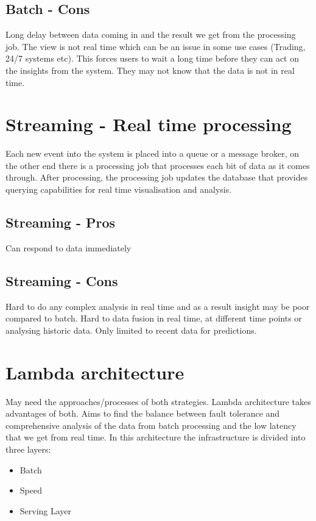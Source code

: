 \subsection{Batch - Cons}
Long delay between data coming in and the result we get from the processing job.
The view is not real time which can be an issue in some use cases (Trading, 24/7 systems etc).
This forces users to wait a long time before they can act on the insights from the system.
They may not know that the data is not in real time.

\section{Streaming - Real time processing}
Each new event into the system is placed into a queue or a message broker, on the other end there is a processing job that processes each bit of data as it comes through.
After processing, the processing job updates the database that provides querying capabilities for real time visualisation and analysis.

\subsection{Streaming - Pros}
Can respond to data immediately

\subsection{Streaming - Cons}
Hard to do any complex analysis in real time and as a result insight may be poor compared to batch.
Hard to data fusion in real time, at different time points or analysing historic data.
Only limited to recent data for predictions.

\section{Lambda architecture}

May need the approaches/processes of both strategies.
Lambda architecture takes advantages of both.
Aims to find the balance between fault tolerance and comprehensive analysis of the data from batch processing and the low latency that we get from real time.
In this architecture the infrastructure is divided into three layers:

\begin{itemize}
    \item Batch
    \item Speed
    \item Serving Layer
\end{itemize}

